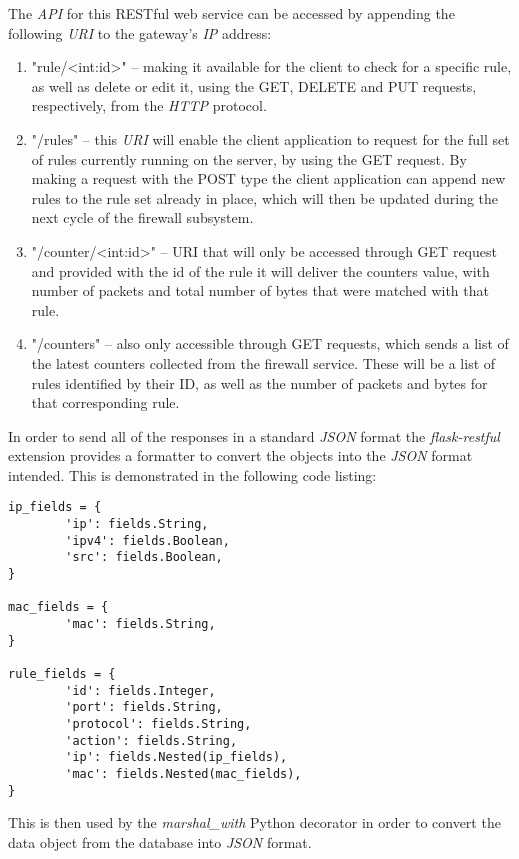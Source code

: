 The \emph{\ac{API}} for this RESTful web service can be accessed by appending
the following \emph{\ac{URI}} to the gateway's \emph{\ac{IP}} address:
\begin{enumerate}
	\item "rule/<int:id>" -- making it available for the client to check for a
		specific rule, as well as delete or edit it, using the GET, DELETE and
		PUT requests, respectively, from the \emph{\ac{HTTP}} protocol.
	\item "/rules" -- this \emph{\ac{URI}} will enable the client application to request for
		the full set of rules currently running on the server, by using the GET
		request. By making a request with the POST type the client application
		can append new rules to the rule set already in place, which will then
		be updated during the next cycle of the firewall subsystem.
	\item "/counter/<int:id>" -- URI that will only be accessed through GET
		request and provided with the id of the rule it will deliver the
		counters value, with number of packets and total number of bytes that
		were matched with that rule.
	\item "/counters" -- also only accessible through GET requests, which sends
		a list of the latest counters collected from the firewall service. These
		will be a list of rules identified by their ID, as well as the number of
		packets and bytes for that corresponding rule.
\end{enumerate}

In order to send all of the responses in a standard \emph{\ac{JSON}} format the
\emph{flask-restful} extension provides a formatter to convert the objects into
the \emph{\ac{JSON}} format intended. This is demonstrated in the following code
listing:

\begin{lstlisting}[caption=Example of the email JSON template.]
ip_fields = {
        'ip': fields.String,
        'ipv4': fields.Boolean,
        'src': fields.Boolean,
}

mac_fields = {
        'mac': fields.String,
}

rule_fields = {
        'id': fields.Integer,
        'port': fields.String,
        'protocol': fields.String,
        'action': fields.String,
        'ip': fields.Nested(ip_fields),
        'mac': fields.Nested(mac_fields),
}
\end{lstlisting}

This is then used by the \emph{marshal\_with} Python decorator in order to
convert the data object from the database into \emph{\ac{JSON}} format.

